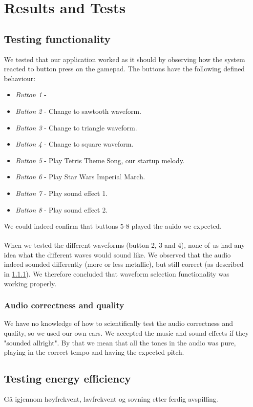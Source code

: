\section{Results and Tests}

\subsection{Testing functionality}
We tested that our application worked as it should by observing how the system reacted to button press on the gamepad. The buttons have the following defined behaviour:
\begin{itemize}
	\item \emph{Button 1} - 
	\item \emph{Button 2} - Change to sawtooth waveform.
	\item \emph{Button 3} - Change to triangle waveform.
	\item \emph{Button 4} - Change to square waveform.
	\item \emph{Button 5} - Play Tetris Theme Song, our startup melody.
	\item \emph{Button 6} - Play Star Wars Imperial March.
	\item \emph{Button 7} - Play sound effect 1.
	\item \emph{Button 8} - Play sound effect 2.
\end{itemize}

We could indeed confirm that buttons 5-8 played the auido we expected. \\
\\
When we tested the different waveforms (button 2, 3 and 4), none of us had any idea what the different waves would sound like. We observed that the audio indeed sounded differently (more or less metallic), but still correct (as described in \ref{audio_correctness}). We therefore concluded that waveform selection functionality was working properly.

\subsubsection{Audio correctness and quality}
\label{audio_correctness}
We have no knowledge of how to scientifically test the audio correctness and quality, so we used our own ears. We accepted the music and sound effects if they "sounded allright". By that we mean that all the tones in the audio was pure, playing in the correct tempo and having the expected pitch. 

\subsection{Testing energy efficiency}
Gå igjennom høyfrekvent, lavfrekvent og sovning etter ferdig avspilling.
